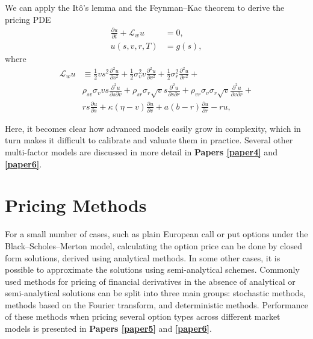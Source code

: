 \documentclass{UUThesisTemplate}
\begin{document}
\par
We can apply the It\^{o}'s lemma and the Feynman--Kac theorem to derive the pricing PDE
\begin{align}
\frac{\partial u}{\partial t}+\mathcal{L}_w u&=0, \nonumber \\
u(s,v,r,T) &= g(s), \label{hhwPDE}
\end{align}
where
\begin{align}
\mathcal{L}_{w} u &\equiv  \frac{1}{2}vs^2\frac{\partial^2 u}{\partial s^2} + \frac{1}{2}\sigma_v^2v\frac{\partial^2 u}{\partial v^2}  + \frac{1}{2}\sigma_r^2\frac{\partial^2 u}{\partial r^2} + \nonumber \\
                             & \rho_{sv}\sigma_v vs\frac{\partial^2 u}{\partial s\partial v} + \rho_{sr}\sigma_r \sqrt{v} s\frac{\partial^2 u}{\partial s\partial r} + \rho_{vr}\sigma_v\sigma_r \sqrt{v}\frac{\partial^2 u}{\partial v\partial r} + \nonumber \\
                             & rs\frac{\partial u}{\partial s} + \kappa(\eta-v)\frac{\partial u}{\partial v} + a(b-r)\frac{\partial u}{\partial r} - ru, \label{eqHHWop}
\end{align}

\par
Here, it becomes clear how advanced models easily grow in complexity, which in turn makes it difficult to calibrate and valuate them in practice. Several other multi-factor models are discussed in more detail in \textbf{Papers \ref{paper4}} and \textbf{\ref{paper6}}. 
%





%
\section{Pricing Methods}
\label{sec:methods}

\par
For a small number of cases, such as plain European call or put options under the Black--Scholes--Merton model, calculating the option price can be done by closed form solutions, derived using analytical methods. In some other cases, it is possible to approximate the solutions using semi-analytical schemes. Commonly used methods for pricing of financial derivatives in the absence of analytical or semi-analytical solutions can be split into three main groups: stochastic methods, methods based on the Fourier transform, and deterministic methods. Performance of these methods when pricing several option types across different market models is presented in \textbf{Papers \ref{paper5}} and \textbf{\ref{paper6}}.%
\end{document}
